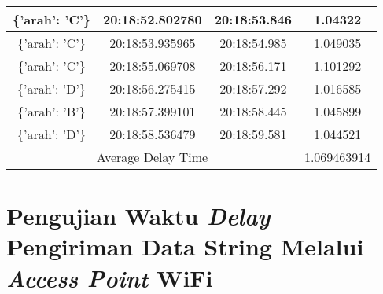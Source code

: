 \begin{longtable}{|ccc|c|}
    \multicolumn{1}{|c|}{\{'arah': 'C'\}} & \multicolumn{1}{c|}{20:18:52.802780} & 20:18:53.846       & 1.04322     \\ \hline
    \multicolumn{1}{|c|}{\{'arah': 'C'\}} & \multicolumn{1}{c|}{20:18:53.935965} & 20:18:54.985       & 1.049035    \\ \hline
    \multicolumn{1}{|c|}{\{'arah': 'C'\}} & \multicolumn{1}{c|}{20:18:55.069708} & 20:18:56.171       & 1.101292    \\ \hline
    \multicolumn{1}{|c|}{\{'arah': 'D'\}} & \multicolumn{1}{c|}{20:18:56.275415} & 20:18:57.292       & 1.016585    \\ \hline
    \multicolumn{1}{|c|}{\{'arah': 'B'\}} & \multicolumn{1}{c|}{20:18:57.399101} & 20:18:58.445       & 1.045899    \\ \hline
    \multicolumn{1}{|c|}{\{'arah': 'D'\}} & \multicolumn{1}{c|}{20:18:58.536479} & 20:18:59.581       & 1.044521    \\ \hline
    \multicolumn{3}{|c|}{Average Delay Time}                                                          & 1.069463914 \\ \hline
\end{longtable}

\section{Pengujian Waktu \emph{Delay} Pengiriman Data String Melalui \emph{Access Point} WiFi}
\label{sec:delayWiFi}

